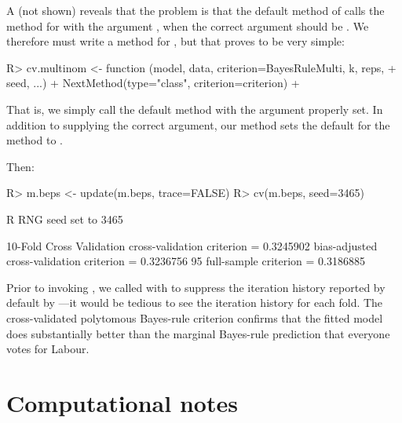 \documentclass[
]{jss}
\begin{document}
A  (not shown) reveals that the problem is that the
default method of  calls the  method for
 with the argument , when the
correct argument should be . We therefore must write
a  method for , but that proves to be very
simple:

\begin{CodeChunk}
\begin{CodeInput}
R> cv.multinom <- function (model, data, criterion=BayesRuleMulti, k, reps,
+                          seed, ...){
+   NextMethod(type="class", criterion=criterion)
+ }
\end{CodeInput}
\end{CodeChunk}

That is, we simply call the default  method with the
 argument properly set. In addition to supplying the correct
 argument, our method sets the default  for
the  method to .

Then:

\begin{CodeChunk}
\begin{CodeInput}
R> m.beps <- update(m.beps, trace=FALSE)
R> cv(m.beps, seed=3465)
\end{CodeInput}
\begin{CodeOutput}
R RNG seed set to 3465
\end{CodeOutput}
\begin{CodeOutput}
10-Fold Cross Validation
cross-validation criterion = 0.3245902
bias-adjusted cross-validation criterion = 0.3236756
95%
full-sample criterion = 0.3186885 
\end{CodeOutput}
\end{CodeChunk}

Prior to invoking , we called  with
 to suppress the iteration history reported by default
by ---it would be tedious to see the iteration history
for each fold. The cross-validated polytomous Bayes-rule criterion
confirms that the fitted model does substantially better than the
marginal Bayes-rule prediction that everyone votes for Labour.

\hypertarget{computational-notes}{%
\section{Computational notes}\label{computational-notes}}
\end{document}
